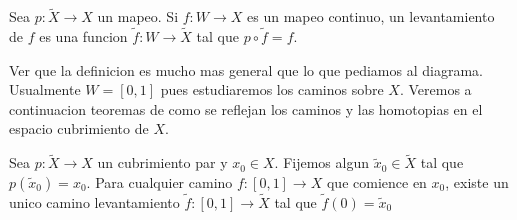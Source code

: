 \begin{definicion}[Levantamiento de \(f\)]
  Sea \(p : \tilde X \to X\) un mapeo. Si \(f : W \to X\) es un mapeo
  continuo, un levantamiento de \(f\) es una funcion \(\tilde f : W \to
  \tilde X\) tal que \(p \circ \tilde f = f\).
\end{definicion}
Ver que la definicion es mucho mas general que lo que pediamos al
diagrama. Usualmente \(W = [0,1]\) pues estudiaremos los caminos sobre
\(X\). Veremos a continuacion teoremas de como se reflejan los caminos
y las homotopias en el espacio cubrimiento de \(X\).
\begin{teorema}\label{thm:lifting-theorem}
  Sea \(p : \tilde X \to X\) un cubrimiento par y \(x_0 \in X\). Fijemos
  algun \(\tilde x _0 \in \tilde X\) tal que \(p(\tilde x _0) = x_0 \).
  Para cualquier camino \(f : [0,1] \to X\) que comience en \(x_0\), existe
  un unico camino levantamiento \(\tilde f : [0,1] \to \tilde X\) tal que
  \(\tilde f (0) = \tilde x _0\)
\end{teorema}
